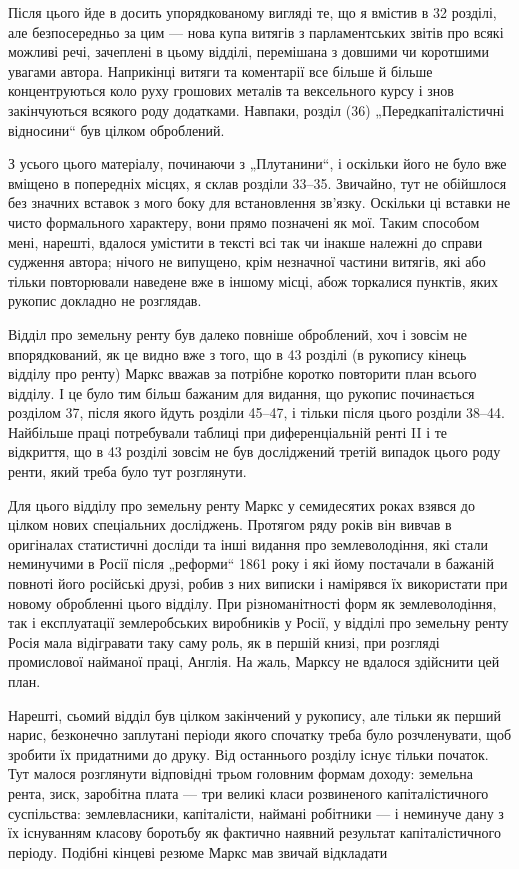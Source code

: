 Після цього йде в досить упорядкованому вигляді те, що я
вмістив в 32 розділі, але безпосередньо за цим — нова купа витягів
з парламентських звітів про всякі можливі речі, зачеплені
в цьому відділі, перемішана з довшими чи коротшими увагами
автора. Наприкінці витяги та коментарії все більше й більше
концентруються коло руху грошових металів та вексельного
курсу і знов закінчуються всякого роду додатками. Навпаки, розділ
(36) „Передкапіталістичні відносини“ був цілком оброблений.

З усього цього матеріалу, починаючи з „Плутанини“, і оскільки
його не було вже вміщено в попередніх місцях, я склав
розділи 33--35. Звичайно, тут не обійшлося без значних вставок
з мого боку для встановлення зв’язку. Оскільки ці вставки
не чисто формального характеру, вони прямо позначені як мої.
Таким способом мені, нарешті, вдалося умістити в тексті всі так
чи інакше належні до справи судження автора; нічого не випущено,
крім незначної частини витягів, які або тільки повторювали
наведене вже в іншому місці, абож торкалися пунктів, яких
рукопис докладно не розглядав.

Відділ про земельну ренту був далеко повніше оброблений,
хоч і зовсім не впорядкований, як це видно вже з того, що
в 43 розділі (в рукопису кінець відділу про ренту) Маркс
вважав за потрібне коротко повторити план всього відділу. І це
було тим більш бажаним для видання, що рукопис починається
розділом 37, після якого йдуть розділи 45--47, і тільки після
цього розділи 38--44. Найбільше праці потребували таблиці
при диференціальній ренті II і те відкриття, що в 43 розділі
зовсім не був досліджений третій випадок цього роду ренти,
який треба було тут розглянути.

Для цього відділу про земельну ренту Маркс у семидесятих
роках взявся до цілком нових спеціальних досліджень. Протягом
ряду років він вивчав в оригіналах статистичні досліди
та інші видання про землеволодіння, які стали неминучими
в Росії після „реформи“ 1861 року і які йому постачали в бажаній
повноті його російські друзі, робив з них виписки і намірявся
їх використати при новому обробленні цього відділу. При
різноманітності форм як землеволодіння, так і експлуатації
землеробських виробників у Росії, у відділі про земельну ренту
Росія мала відігравати таку саму роль, як в першій книзі, при
розгляді промислової найманої праці, Англія. На жаль, Марксу
не вдалося здійснити цей план.

Нарешті, сьомий відділ був цілком закінчений у рукопису,
але тільки як перший нарис, безконечно заплутані періоди якого
спочатку треба було розчленувати, щоб зробити їх придатними
до друку. Від останнього розділу існує тільки початок. Тут
малося розглянути відповідні трьом головним формам доходу:
земельна рента, зиск, заробітна плата — три великі класи розвиненого
капіталістичного суспільства: землевласники, капіталісти,
наймані робітники — і неминуче дану з їх існуванням класову
боротьбу як фактично наявний результат капіталістичного
періоду. Подібні кінцеві резюме Маркс мав звичай відкладати
\parbreak{}  %
